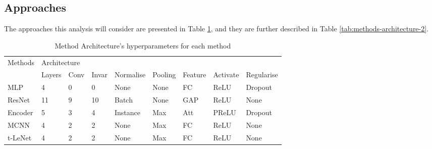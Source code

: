 \documentclass[journal]{IEEEtran}
\begin{document}
\subsection{Approaches}
The approaches this analysis will consider are presented in Table \ref{tab:methods-architecture-1}, and they are further described in Table \ref{tab:methods-architecture-2}.

\begin{table}[]
    \renewcommand{\arraystretch}{1.3}
    \centering
    \caption{Method Architecture's hyperparameters for each method}
    \label{tab:methods-architecture-1}
    
    \begin{tabular}{lllllllll}
    \hline
    \multirow{2}{*}{Methods} & \multicolumn{8}{l}{Architecture}                                              \\ \cline{2-9} 
                             & Layers & Conv & Invar & Normalise & Pooling & Feature & Activate & Regularise \\ \hline
    MLP                      & 4      & 0    & 0     & None      & None    & FC      & ReLU     & Dropout    \\
    ResNet                   & 11     & 9    & 10    & Batch     & None    & GAP     & ReLU     & None       \\
    Encoder                  & 5      & 3    & 4     & Instance  & Max     & Att     & PReLU    & Dropout    \\
    MCNN                     & 4      & 2    & 2     & None      & Max     & FC      & ReLU     & None       \\
    t-LeNet                  & 4      & 2    & 2     & None      & Max     & FC      & ReLU     & None       \\ \hline
    \end{tabular}
    
\end{table}
\end{document}
